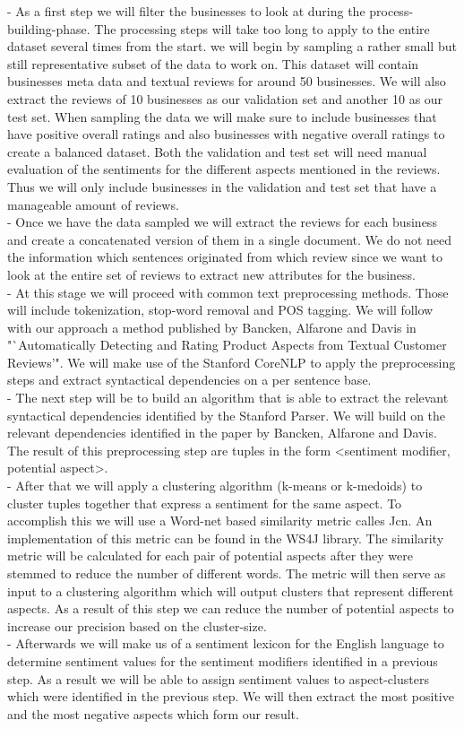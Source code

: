 - As a first step we will filter the businesses to look at during the process-building-phase. The processing steps will take too long to apply to the entire dataset several times from the start. we will begin by sampling a rather small but still representative subset of the data to work on. This dataset will contain businesses meta data and textual reviews for around 50 businesses. We will also extract the reviews of 10 businesses as our validation set and another 10 as our test set. When sampling the data we will make sure to include businesses that have positive overall ratings and also businesses with negative overall ratings to create a balanced dataset. Both the validation and test set will need manual evaluation of the sentiments for the different aspects mentioned in the reviews. Thus we will only include businesses in the validation and test set that have a manageable amount of reviews. \\
- Once we have the data sampled we will extract the reviews for each business and create a concatenated version of them in a single document. We do not need the information which sentences originated from which review since we want to look at the entire set of reviews to extract new attributes for the business.\\
- At this stage we will proceed with common text preprocessing methods. Those will include tokenization, stop-word removal and POS tagging. We will follow with our approach a method published by Bancken, Alfarone and Davis in "`Automatically Detecting and Rating Product Aspects from Textual Customer Reviews'". We will make use of the Stanford CoreNLP to apply the preprocessing steps and extract syntactical dependencies on a per sentence base. \\
- The next step will be to build an algorithm that is able to extract the relevant syntactical dependencies identified by the Stanford Parser. We will build on the relevant dependencies identified in the paper by Bancken, Alfarone and Davis. The result of this preprocessing step are tuples in the form <sentiment modifier, potential aspect>. \\
- After that we will apply a clustering algorithm (k-means or k-medoids) to cluster tuples together that express a sentiment for the same aspect. To accomplish this we will use a Word-net based similarity metric calles Jcn. An implementation of this metric can be found in the WS4J library. The similarity metric will be calculated for each pair of potential aspects after they were stemmed to reduce the number of different words. The metric will then serve as input to a clustering algorithm which will output clusters that represent different aspects. As a result of this step we can reduce the number of potential aspects to increase our precision based on the cluster-size.\\
- Afterwards we will make us of a sentiment lexicon for the English language to determine sentiment values for the sentiment modifiers identified in a previous step. As a result we will be able to assign sentiment values to aspect-clusters which were identified in the previous step. We will then extract the most positive and the most negative aspects which form our result.